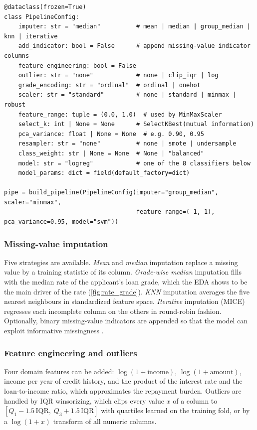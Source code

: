 \begin{listing}[H]
  \begin{verbatim}
@dataclass(frozen=True)
class PipelineConfig:
    imputer: str = "median"          # mean | median | group_median | knn | iterative
    add_indicator: bool = False      # append missing-value indicator columns
    feature_engineering: bool = False
    outlier: str = "none"            # none | clip_iqr | log
    grade_encoding: str = "ordinal"  # ordinal | onehot
    scaler: str = "standard"         # none | standard | minmax | robust
    feature_range: tuple = (0.0, 1.0)  # used by MinMaxScaler
    select_k: int | None = None      # SelectKBest(mutual information)
    pca_variance: float | None = None  # e.g. 0.90, 0.95
    resampler: str = "none"          # none | smote | undersample
    class_weight: str | None = None  # None | "balanced"
    model: str = "logreg"            # one of the 8 classifiers below
    model_params: dict = field(default_factory=dict)

pipe = build_pipeline(PipelineConfig(imputer="group_median", scaler="minmax",
                                     feature_range=(-1, 1), pca_variance=0.95, model="svm"))
  \end{verbatim}
  \caption{Every pipeline step is selected through one configuration object.}
  \label{lst:config}
\end{listing}

\subsubsection{Missing-value imputation}
Five strategies are available.
\emph{Mean} and \emph{median} imputation replace a missing value by a training statistic of its column.
\emph{Grade-wise median} imputation fills  with the median rate of the applicant's loan grade, which the EDA shows to be the main driver of the rate (\cref{fig:rate_grade}).
\emph{KNN} imputation \cite{troyanskaya2001} averages the five nearest neighbours in standardized feature space.
\emph{Iterative} imputation (MICE) \cite{mice} regresses each incomplete column on the others in round-robin fashion.
Optionally, binary missing-value indicators are appended so that the model can exploit informative missingness \cite{rubin1987}.

\subsubsection{Feature engineering and outliers}
Four domain features can be added: $\log(1+\text{income})$, $\log(1+\text{amount})$, income per year of credit history, and the product of the interest rate and the loan-to-income ratio, which approximates the repayment burden.
Outliers are handled by IQR winsorizing, which clips every value $x$ of a column to $[Q_1 - 1.5\,\mathrm{IQR},\; Q_3 + 1.5\,\mathrm{IQR}]$ with quartiles learned on the training fold, or by a $\log(1+x)$ transform of all numeric columns.

